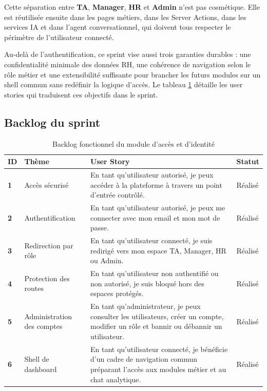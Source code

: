 Cette séparation entre \textbf{TA}, \textbf{Manager}, \textbf{HR} et \textbf{Admin} n'est pas cosmétique. Elle est réutilisée ensuite dans les pages métiers, dans les Server Actions, dans les services IA et dans l'agent conversationnel, qui doivent tous respecter le périmètre de l'utilisateur connecté.

Au-delà de l'authentification, ce sprint vise aussi trois garanties durables : une confidentialité minimale des données RH, une cohérence de navigation selon le rôle métier et une extensibilité suffisante pour brancher les futurs modules sur un shell commun sans redéfinir la logique d'accès.
Le tableau \ref{tab:access-identity-backlog} détaille les user stories qui traduisent ces objectifs dans le sprint.

\subsection{Backlog du sprint}
\begin{table}[H]
  \centering
  \caption{\label{tab:access-identity-backlog}Backlog fonctionnel du module d'accès et d'identité}
  \begin{tabularx}{\textwidth}{>{\bfseries}p{1.3cm}p{3cm}X>{\raggedright\arraybackslash}p{2cm}}
    \toprule
    ID & Thème & User Story & Statut \\
    \midrule
    1 & Accès sécurisé & En tant qu'utilisateur autorisé, je peux accéder à la plateforme à travers un point d'entrée contrôlé. & Réalisé \\
    2 & Authentification & En tant qu'utilisateur autorisé, je peux me connecter avec mon email et mon mot de passe. & Réalisé \\
    3 & Redirection par rôle & En tant qu'utilisateur connecté, je suis redirigé vers mon espace TA, Manager, HR ou Admin. & Réalisé \\
    4 & Protection des routes & En tant qu'utilisateur non authentifié ou non autorisé, je suis bloqué hors des espaces protégés. & Réalisé \\
    5 & Administration des comptes & En tant qu'administrateur, je peux consulter les utilisateurs, créer un compte, modifier un rôle et bannir ou débannir un utilisateur. & Réalisé \\
    6 & Shell de dashboard & En tant qu'utilisateur connecté, je bénéficie d'un cadre de navigation commun préparant l'accès aux modules métier et au chat analytique. & Réalisé \\
    \bottomrule
  \end{tabularx}
\end{table}

